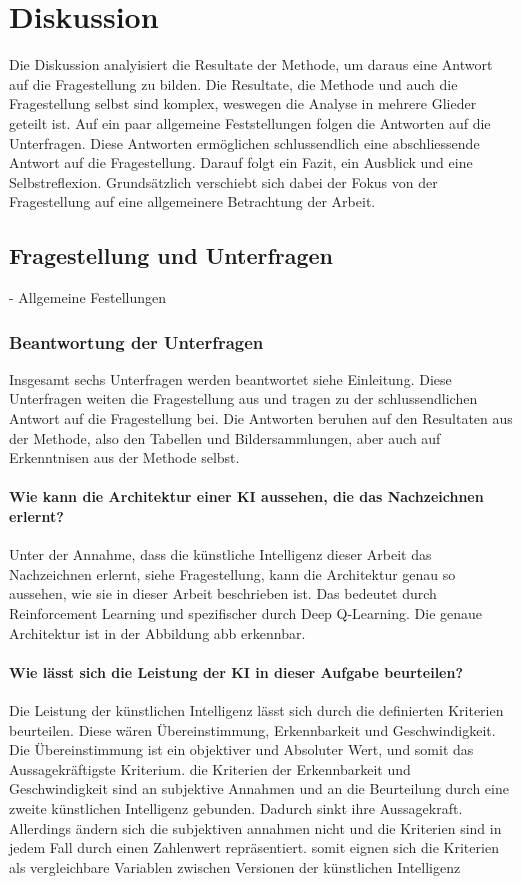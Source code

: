 \chapter{Diskussion}
Die Diskussion analyisiert die Resultate der Methode, um daraus eine Antwort auf
die Fragestellung zu bilden. Die Resultate, die Methode und auch die
Fragestellung selbst sind komplex, weswegen die Analyse in mehrere Glieder
geteilt ist. Auf ein paar allgemeine Feststellungen folgen die Antworten auf die
Unterfragen. Diese Antworten ermöglichen schlussendlich eine abschliessende
Antwort auf die Fragestellung. Darauf folgt ein Fazit, ein Ausblick und eine
Selbstreflexion. Grundsätzlich verschiebt sich dabei der Fokus von der
Fragestellung auf eine allgemeinere Betrachtung der Arbeit.

\section{Fragestellung und Unterfragen}
- Allgemeine Festellungen

\subsection{Beantwortung der Unterfragen}
Insgesamt sechs Unterfragen werden beantwortet {siehe Einleitung}. Diese
Unterfragen weiten die Fragestellung aus und tragen zu der schlussendlichen
Antwort auf die Fragestellung bei. Die Antworten beruhen auf den Resultaten aus
der Methode, also den Tabellen und Bildersammlungen, aber auch auf Erkenntnisen
aus der Methode selbst.

\subsubsection*{Wie kann die Architektur einer KI aussehen, die das Nachzeichnen erlernt?}
Unter der Annahme, dass die künstliche Intelligenz dieser Arbeit das
Nachzeichnen erlernt, {siehe Fragestellung}, kann die Architektur genau so
aussehen, wie sie in dieser Arbeit beschrieben ist. Das bedeutet durch
Reinforcement Learning und spezifischer durch Deep Q-Learning. Die genaue
Architektur ist in der Abbildung {abb} erkennbar.

\subsubsection*{Wie lässt sich die Leistung der KI in dieser Aufgabe beurteilen?}
Die Leistung der künstlichen Intelligenz lässt sich durch die definierten
Kriterien beurteilen. Diese wären Übereinstimmung, Erkennbarkeit und
Geschwindigkeit. Die Übereinstimmung ist ein objektiver und Absoluter Wert,
und somit das Aussagekräftigste Kriterium. die Kriterien der Erkennbarkeit
und Geschwindigkeit sind an subjektive Annahmen und an die Beurteilung durch
eine zweite künstlichen Intelligenz gebunden. Dadurch sinkt ihre
Aussagekraft. Allerdings ändern sich die subjektiven annahmen nicht und die
Kriterien sind in jedem Fall durch einen Zahlenwert repräsentiert. somit
eignen sich die Kriterien als vergleichbare Variablen zwischen Versionen der künstlichen Intelligenz

